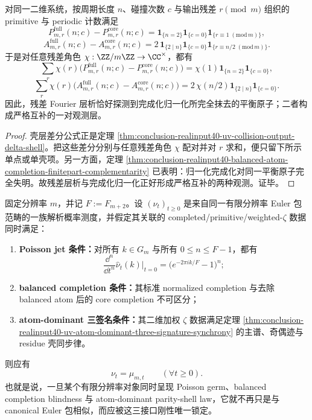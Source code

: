 \begin{theorem}[残差壳层层析与完成化归一化的严格互补性]\label{thm:conclusion-realinput40-residual-shell-completion-complementarity}
对同一二维系统，按周期长度 \(n\)、碰撞次数 \(c\) 与输出残差 \(r\pmod m\) 组织的 primitive 与 periodic 计数满足
\[
P^{\mathrm{full}}_{m,r}(n;c)-P^{\mathrm{core}}_{m,r}(n;c)
=
\mathbf 1_{\{n=2\}}\mathbf 1_{\{c=0\}}\mathbf 1_{\{r\equiv 1\;(\mathrm{mod}\,m)\}},
\]
\[
A^{\mathrm{full}}_{m,r}(n;c)-A^{\mathrm{core}}_{m,r}(n;c)
=
2\,\mathbf 1_{\{2\mid n\}}\mathbf 1_{\{c=0\}}\mathbf 1_{\{r\equiv n/2\;(\mathrm{mod}\,m)\}}.
\]
于是对任意残差角色 \(\chi:\ZZ/m\ZZ\to\CC^\times\)，都有
\[
\sum_r \chi(r)\bigl(P^{\mathrm{full}}_{m,r}(n;c)-P^{\mathrm{core}}_{m,r}(n;c)\bigr)
=
\chi(1)\mathbf 1_{\{n=2\}}\mathbf 1_{\{c=0\}},
\]
\[
\sum_r \chi(r)\bigl(A^{\mathrm{full}}_{m,r}(n;c)-A^{\mathrm{core}}_{m,r}(n;c)\bigr)
=
2\,\chi(n/2)\mathbf 1_{\{2\mid n\}}\mathbf 1_{\{c=0\}}.
\]
因此，残差 Fourier 层析恰好探测到完成化归一化所完全抹去的平衡原子；二者构成严格互补的一对观测层。
\end{theorem}
\begin{proof}
壳层差分公式正是定理 \ref{thm:conclusion-realinput40-uv-collision-output-delta-shell}。把这些差分分别与任意残差角色 \(\chi\) 配对并对 \(r\) 求和，便只留下所示单点或单壳项。另一方面，定理 \ref{thm:conclusion-realinput40-balanced-atom-completion-finitepart-complementarity} 已表明：归一化完成化对同一平衡原子完全失明。故残差层析与完成化归一化正好形成严格互补的两种观测。证毕。
\end{proof}

\begin{conjecture}\label{conj:conclusion-balanced-atom-three-interface-rigidity}
固定分辨率 \(m\)，并记 \(F:=F_{m+2}\)。设 \((\nu_t)_{t\ge 0}\) 是来自同一有限分辨率 Euler 包范畴的一族解析概率测度，并假定其关联的 completed/primitive/weighted-\(\zeta\) 数据同时满足：
\begin{enumerate}
  \item \textbf{Poisson jet 条件：}对所有 \(k\in G_m\) 与所有 \(0\le n\le F-1\)，都有
  \[
  \frac{\dd^n}{\dd t^n}\widehat\nu_t(k)\Big|_{t=0}
  =
  \bigl(e^{-2\pi ik/F}-1\bigr)^n;
  \]
  \item \textbf{balanced completion 条件：}其标准 normalized completion 与去除 balanced atom 后的 core completion 不可区分；
  \item \textbf{atom-dominant 三签名条件：}其二维加权 \(\zeta\) 数据满足定理 \ref{thm:conclusion-realinput40-uv-atom-dominant-three-signature-synchrony} 的主谱、奇偶迹与 residue 壳同步律。
\end{enumerate}
则应有
\[
\nu_t=\mu_{m,t}
\qquad
(\forall t\ge 0).
\]
也就是说，一旦某个有限分辨率对象同时呈现 Poisson germ、balanced completion blindness 与 atom-dominant parity-shell law，它就不再只是与 canonical Euler 包相似，而应被这三接口刚性唯一锁定。
\end{conjecture}


